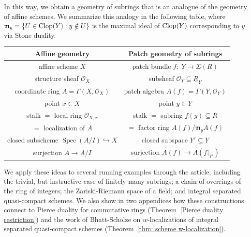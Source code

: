 \documentclass[11pt]{amsart}
\begin{document}
\medskip
 
In this way, we obtain a geometry of subrings that is an analogue of the geometry of affine  schemes. We summarize this analogy in the following table, where  $\mathfrak m_y=\{U\in\mbox{\rm Clop}(Y):y\notin U\}$ is the maximal ideal of $\mbox{\rm Clop}(Y)$ corresponding to $y$ via Stone duality.


\begin{center}
\renewcommand{\arraystretch}{1.4}
 \begin{tabular}{|c|c|}
\hline
\textbf{Affine geometry} & \textbf{Patch geometry of subrings} \\
\hline
affine scheme $X$ 
& patch bundle $f\colon\; Y\to \Sigma(R)$ \\
\hline
structure sheaf $\mathcal O_X$
& subsheaf $\mathcal O_Y \subseteq \underline{R}_Y$ \\
\hline
coordinate ring $A=\Gamma(X,\mathcal O_X)$
& patch algebra $A(f)=\Gamma(Y,\mathcal O_Y)$ \\
\hline
point $x\in X$
& point $y\in Y$ \\
\hline
stalk $=$ local ring $\mathcal O_{X,x}$
& stalk $=$ subring $f(y)\subseteq R$ \\

$=$ localization of $A$
& $=$ factor ring $A(f)/\mathfrak m_yA(f)$ \\
\hline
closed subscheme $\operatorname{Spec}(A/I)\hookrightarrow X$
& closed subspace $Y'\subseteq Y$ \\
\hline
surjection $A\to A/I$
& surjection $A(f)\to A(f|_{Y'})$ \\
\hline
\end{tabular}
\end{center}
\smallskip


\smallskip


We apply these ideas to several running examples through the article, including the trivial, but instructive case of finitely many subrings; a chain of overrings of the ring of integers; the Zariski-Riemann space of a field; and integral separated quasi-compact schemes.  We also show in two appendices how these constructions connect to Pierce duality for commutative rings (Theorem~\ref{Pierce duality restriction}) and the work of Bhatt-Scholze on $w$-localizations of integral separated  quasi-compact schemes (Theorem~\ref{thm: scheme w-localization}).
\end{document}
